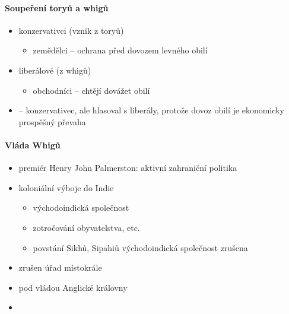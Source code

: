 \paragraph{Soupeření toryů a whigů}
\begin{itemize}
\item konzervativci (vznik z toryů)
	\begin{itemize}
	\item zemědělci -- ochrana před dovozem levného obilí
	\end{itemize}
\item liberálové (z whigů)
	\begin{itemize}
	\item obchodníci -- chtějí dovážet obilí 
	\end{itemize}
\item {} -- konzervativec, ale hlasoval s liberály, protože dovoz obilí je ekonomicky prospěšný \ra převaha
\end{itemize}

\paragraph{Vláda Whigů}
\begin{itemize}
\item premiér Henry John Palmerston: aktivní zahraniční politika
\item koloniální výboje do Indie
	\begin{itemize}
	\item východoindická společnost
	\item zotročování obyvatelstva, etc.
	\item povstání Sikhů, Sipahiů \ra východoindická společnost zrušena
	\end{itemize}
\item zrušen úřad místokrále
\item {} pod vládou Anglické královny
\item {}
\end{itemize}

